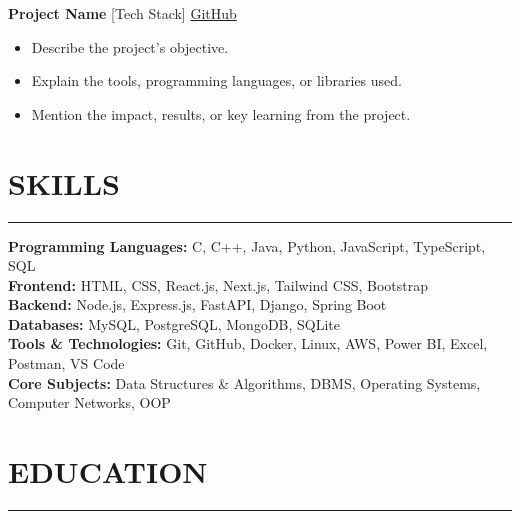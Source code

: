 \documentclass[a4paper,11pt]{article}
\newcommand{\ressection}[1]{\vspace{-2mm}\section*{\textbf{#1}}\vspace{-6mm}\noindent\rule{\textwidth}{0.1pt}}
\begin{document}
\vspace{-10pt}

\noindent
\textbf{Project Name} [Tech Stack]
\href{https://github.com/yourusername/project}{GitHub}

\vspace{-10pt}

\begin{itemize}[leftmargin=*]
\setlength{\itemsep}{2pt}

\item Describe the project's objective.

\item Explain the tools, programming languages, or libraries used.

\item Mention the impact, results, or key learning from the project.

\end{itemize}


\ressection{SKILLS}

\begin{itemize}[leftmargin=*]
\setlength{\itemsep}{2pt}

\textbf{Programming Languages:} C, C++, Java, Python, JavaScript, TypeScript, SQL\\

\textbf{Frontend:} HTML, CSS, React.js, Next.js, Tailwind CSS, Bootstrap\\

\textbf{Backend:} Node.js, Express.js, FastAPI, Django, Spring Boot\\

\textbf{Databases:} MySQL, PostgreSQL, MongoDB, SQLite\\

\textbf{Tools \& Technologies:} Git, GitHub, Docker, Linux, AWS, Power BI, Excel, Postman, VS Code\\

\textbf{Core Subjects:} Data Structures \& Algorithms, DBMS, Operating Systems, Computer Networks, OOP\\

\end{itemize}

\vspace{-10pt}


\ressection{EDUCATION}
\end{document}
